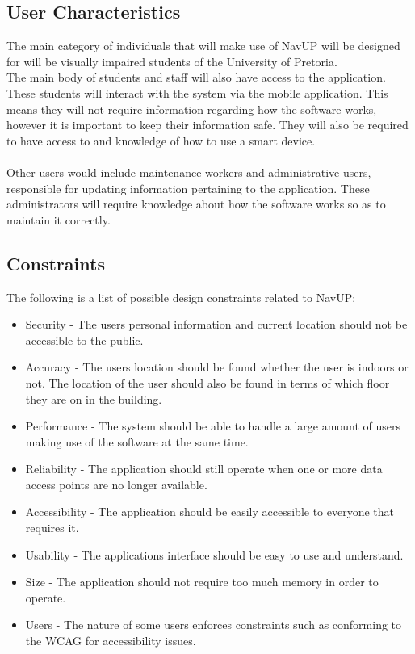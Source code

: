 	\newpage
	\subsection{User Characteristics}
		The main category of individuals that will make use of NavUP will be designed for will be visually impaired students of the University of Pretoria.\\
		The main body of students and staff will also have access to the application.
		These students will interact with the system via the mobile application. This means they will not require information regarding how the software works, however it is important to keep their information safe. They will also be required to have access to and knowledge of how to use a smart device.\\ \\
		Other users would include maintenance workers and administrative users, responsible for updating information pertaining to the application. These administrators will require knowledge about how the software works so as to maintain it correctly.
	
	
	
	\subsection{Constraints}
		The following is a list of possible design constraints related to NavUP:
		
			\begin{itemize}
				\item Security  - The users personal information and current location should not be accessible to the public.
				\item Accuracy - The users location should be found whether the user is indoors or not. The location of the user should also be found in terms of which floor they are on in the building.
				\item Performance - The system should be able to handle a large amount of users making use of the software at the same time.
				\item Reliability - The application should still operate when one or more data access points are no longer available.
				\item Accessibility - The application should be easily accessible to everyone that requires it.
				\item Usability - The applications interface should be easy to use and understand.
				\item Size - The application should not require too much memory in order to operate.
				\item Users - The nature of some users enforces constraints such as conforming to the WCAG for accessibility issues.
			\end{itemize}
	
